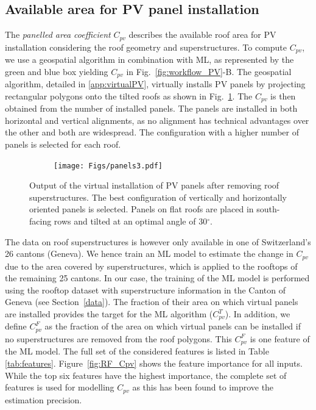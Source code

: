 
\subsection{Available area for PV panel installation}
\label{panels}

The \textit{panelled area coefficient} $C_{\mathit{pv}}$ describes the available roof area for PV installation considering the roof geometry and superstructures. To compute $C_{\mathit{pv}}$, we use a geospatial algorithm in combination with ML, as represented by the green and blue box yielding $C_{\mathit{pv}}$ in Fig.~\ref{fig:workflow_PV}-B.
%
The geospatial algorithm, detailed in \ref{app:virtualPV}, virtually installs PV panels by projecting rectangular polygons onto the tilted roofs as shown in Fig.~\ref{fig:panels}. The $C_{\mathit{pv}}$ is then obtained from the number of installed panels.
The panels are installed in both horizontal and vertical alignments, as no alignment has technical advantages over the other and both are widespread. The configuration with a higher number of panels is selected for each roof.

\begin{figure}[tb]
\centering
\begin{subfigure}{.5\textwidth}
  \centering
  \texttt{[image: Figs/panels3.pdf]}  
\end{subfigure}
\caption{Output of the virtual installation of PV panels after removing roof superstructures. The best configuration of vertically and horizontally oriented panels is selected. Panels on flat roofs are placed in south-facing rows and tilted at an optimal angle of 30$^\circ$.}
\label{fig:panels}
\end{figure}

The data on roof superstructures is however only available in one of Switzerland's 26 cantons (Geneva). We hence train an ML model to estimate the change in $C_{\mathit{pv}}$ due to the area covered by superstructures, which is applied to the rooftops of the remaining 25 cantons. 
%
In our case, the training of the ML model is performed using the rooftop dataset with superstructure information in the Canton of Geneva (see Section~\ref{data}).
The fraction of their area on which virtual panels are installed provides the target for the ML algorithm ($C_{\mathit{pv}}^T$).
In addition, we define $C_{\mathit{pv}}^F$ as the fraction of the area on which virtual panels can be installed if no superstructures are removed from the roof polygons. This $C_{\mathit{pv}}^F$ is one feature of the ML model. %
The full set of the considered features is listed in Table \ref{tab:features}. 
Figure~\ref{fig:RF_Cpv} shows the feature importance for all inputs. 
While the top six features have the highest importance, 
the complete set of features is used for modelling $C_{\mathit{pv}}$ as this has been found to improve the estimation precision.

